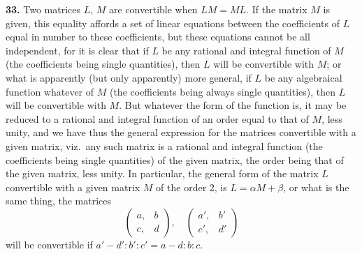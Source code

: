 \documentclass[11pt,a4paper]{book}
\begin{document}
\begin{center}
\newpage

\medskip
\noindent\textbf{33.} Two matrices $L$, $M$ are convertible when $LM = ML$. If the matrix $M$ is given, this equality affords a set of linear equations between the coefficients of $L$ equal in number to these coefficients, but these equations cannot be all independent, for it is clear that if $L$ be any rational and integral function of $M$ (the coefficients being single quantities), then $L$ will be convertible with $M$; or what is apparently (but only apparently) more general, if $L$ be any algebraical function whatever of $M$ (the coefficients being always single quantities), then $L$ will be convertible with $M$. But whatever the form of the function is, it may be reduced to a rational and integral function of an order equal to that of $M$, less unity, and we have thus the general expression for the matrices convertible with a given matrix, viz.\ any such matrix is a rational and integral function (the coefficients being single quantities) of the given matrix, the order being that of the given matrix, less unity. In particular, the general form of the matrix $L$ convertible with a given matrix $M$ of the order 2, is $L = \alpha M + \beta$, or what is the same thing, the matrices
\[
\begin{pmatrix} a, & b \\ c, & d \end{pmatrix},\quad
\begin{pmatrix} a', & b' \\ c', & d' \end{pmatrix}
\]
will be convertible if $a'-d' : b' : c' = a-d : b : c$.


\end{center}
\end{document}
